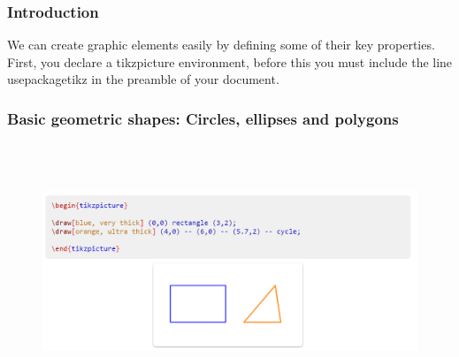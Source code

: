 \documentclass[a4paper,10pt]{article}
\begin{document}
\subsubsection{Introduction}
We can create graphic elements easily by defining some of their key properties.
First, you declare a tikzpicture environment, before this you must include the line  usepackage{tikz} in the preamble of your document.

\subsubsection{Basic geometric shapes: Circles, ellipses and polygons}
\begin{figure}[H]
		\centering
		\includegraphics[height = 3in]{tkz_01.png}
		\caption[Optional caption]{}
		\label{fig:Repository}
	\end{figure}
\paragraph{}

\paragraph{}
\end{document}
